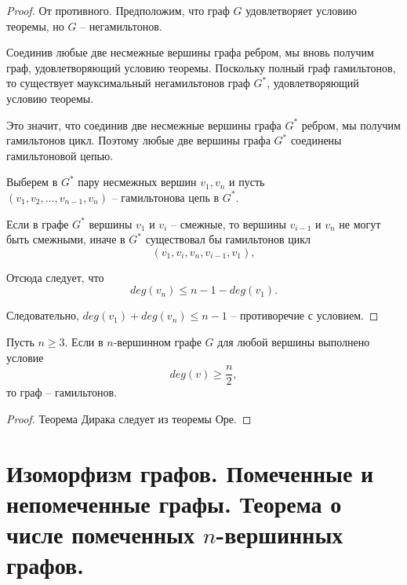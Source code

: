 \begin{proof}
    От противного. Предположим, что граф $ G $ удовлетворяет условию теоремы, но $ G $ -- негамильтонов.

    Соединив любые две несмежные вершины графа ребром, мы вновь получим граф, удовлетворяющий условию теоремы. Поскольку полный граф гамильтонов, то существует мауксимальный негамильтонов граф $ G^* $, удовлетворяющий условию теоремы.

    Это значит, что соединив две несмежные вершины графа $ G^* $ ребром, мы получим гамильтонов цикл. Поэтому любые две вершины графа $ G^* $ соединены гамильтоновой цепью.

    Выберем в $ G^* $ пару несмежных вершин $ v_1,v_n $ и пусть \\ $ (v_1,v_2,\ldots,v_{n-1},v_n) $ -- гамильтонова цепь в $ G^* $.
    \begin{figure}[H]
        \centering
        \label{fig:fig_11}
    \end{figure}

    Если в графе $ G^* $ вершины $ v_1 $ и $ v_i $ -- смежные, то вершины $ v_{i-1} $ и $ v_n $ не могут быть смежными, иначе в $ G^* $ существовал бы гамильтонов цикл
    \[
        (v_1,v_i,v_n,v_{i-1},v_1),
    \]
    \begin{figure}[H]
        \centering
        \label{fig:fig_12}
    \end{figure}

    Отсюда следует, что
    \[
        deg(v_n) \leqslant n-1 - deg(v_1).
    \]

    Следовательно, $ deg(v_1) + deg(v_n) \leqslant n - 1 $ -- противоречие с условием.
\end{proof}

\begin{theorem}[Дирак, 1953]
    Пусть $ n \geqslant 3 $. Если в $ n $-вершинном графе $ G $ для любой вершины выполнено условие
    \[
        deg(v) \geqslant \frac{n}{2},
    \]
    то граф -- гамильтонов.
\end{theorem}

\begin{proof}
    Теорема Дирака следует из теоремы Оре.
\end{proof}

\section{Изоморфизм графов. Помеченные и непомеченные графы. Теорема о числе помеченных $n$-вершинных графов.}

